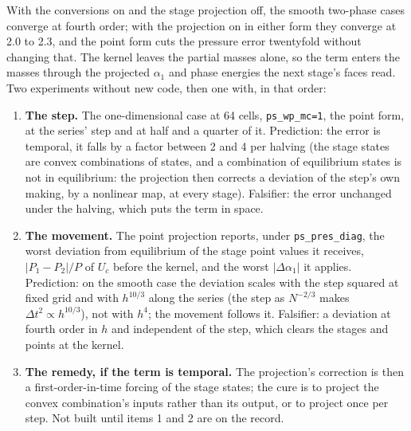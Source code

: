 \documentclass[11pt,a4paper]{article}
\newcommand{\code}[1]{\texttt{\small #1}}
\begin{document}
With the conversions on and the stage projection off, the smooth
two-phase cases converge at fourth order; with the projection on in
either form they converge at 2.0 to 2.3, and the point form cuts the
pressure error twentyfold without changing that.  The kernel leaves the
partial masses alone, so the term enters the masses through the
projected $\alpha_1$ and phase energies the next stage's faces read.
Two experiments without new code, then one with, in that order:
\begin{enumerate}[nosep]
\item \textbf{The step.}  The one-dimensional case at 64 cells,
      \code{ps\_wp\_mc=1}, the point form, at the series' step and at
      half and a quarter of it.  Prediction: the error is temporal, it
      falls by a factor between 2 and 4 per halving (the stage states
      are convex combinations of states, and a combination of
      equilibrium states is not in equilibrium: the projection then
      corrects a deviation of the step's own making, by a nonlinear map,
      at every stage).  Falsifier: the error unchanged under the
      halving, which puts the term in space.
\item \textbf{The movement.}  The point projection reports, under
      \code{ps\_pres\_diag}, the worst deviation from equilibrium of the
      stage point values it receives, $|P_1 - P_2|/P$ of $U_c$ before
      the kernel, and the worst $|\Delta\alpha_1|$ it applies.
      Prediction: on the smooth case the deviation scales with the step
      squared at fixed grid and with $h^{10/3}$ along the series (the
      step as $N^{-2/3}$ makes $\Delta t^2 \propto h^{10/3}$), not with
      $h^4$; the movement follows it.  Falsifier: a deviation at fourth
      order in $h$ and independent of the step, which clears the stages
      and points at the kernel.
\item \textbf{The remedy, if the term is temporal.}  The projection's
      correction is then a first-order-in-time forcing of the stage
      states; the cure is to project the convex combination's inputs
      rather than its output, or to project once per step.  Not built
      until items 1 and 2 are on the record.
\end{enumerate}
\end{document}
